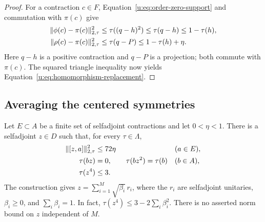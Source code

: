 \begin{proof}
For a contraction $c\in F$, Equation~\eqref{u:eq:order-zero-support} and
commutation with $\pi(c)$ give
\begin{align*}
 \lVert\phi(c)-\pi(c)\rVert_{2,\tau}^2
 &\le\tau((q-h)^2)\le\tau(q-h)\le1-\tau(h),\\
 \lVert\rho(c)-\pi(c)\rVert_{2,\tau}^2
 &\le\tau(q-P)\le1-\tau(h)+\eta.
\end{align*}
Here $q-h$ is a positive contraction and $q-P$ is a projection; both
commute with $\pi(c)$.  The squared triangle inequality now yields
Equation~\eqref{u:eq:homomorphism-replacement}.
\end{proof}

\subsection{Averaging the centered symmetries}

\begin{proposition}
\label{u:prop:averaged-observable}
Let $E\subset A$ be a finite set of selfadjoint contractions and let
$0<\eta<1$.  There is a selfadjoint $z\in D$ such that, for every
$\tau\in\Lambda$,
\begin{equation}
 \begin{aligned}
  \lVert[z,a]\rVert_{2,\tau}^{2}&\le72\eta &&(a\in E),\\
  \tau(bz)&=0,\qquad \tau(bz^2)=\tau(b) &&(b\in A),\\
  \tau(z^4)&\le3.
 \end{aligned}
 \label{u:eq:averaged-observable}
\end{equation}
The construction gives
$z=\sum_{i=1}^M\sqrt{\beta_i}\,r_i$, where the $r_i$ are selfadjoint
unitaries, $\beta_i\ge0$, and $\sum_i\beta_i=1$.  In fact,
$\tau(z^4)\le3-2\sum_i\beta_i^2$.  There is no asserted norm bound on
$z$ independent of $M$.
\end{proposition}

